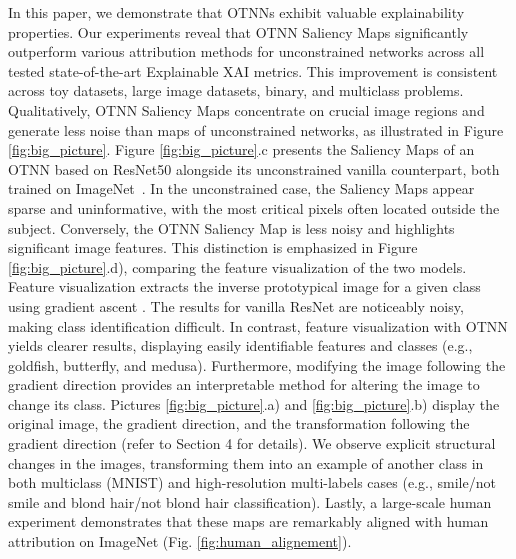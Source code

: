 In this paper, we demonstrate that OTNNs exhibit valuable explainability properties. Our experiments reveal that OTNN Saliency Maps significantly outperform various attribution methods for unconstrained networks across all tested state-of-the-art Explainable XAI metrics. This improvement is consistent across toy datasets, large image datasets, binary, and multiclass problems. Qualitatively, OTNN Saliency Maps concentrate on crucial image regions and generate less noise than maps of unconstrained networks, as illustrated in Figure \ref{fig:big_picture}. Figure \ref{fig:big_picture}.c presents the Saliency Maps of an OTNN based on ResNet50 alongside its unconstrained vanilla counterpart, both trained on ImageNet~\cite{imagenet_cvpr09}. In the unconstrained case, the Saliency Maps appear sparse and uninformative, with the most critical pixels often located outside the subject. Conversely, the OTNN Saliency Map is less noisy and highlights significant image features. This distinction is emphasized in Figure \ref{fig:big_picture}.d), comparing the feature visualization of the two models. Feature visualization extracts the inverse prototypical image for a given class using gradient ascent \cite{olah2017feature,nguyen2016multifaceted}. The results for vanilla ResNet are noticeably noisy, making class identification difficult. In contrast, feature visualization with OTNN yields clearer results, displaying easily identifiable features and classes (e.g., goldfish, butterfly, and medusa). Furthermore, modifying the image following the gradient direction provides an interpretable method for altering the image to change its class. Pictures \ref{fig:big_picture}.a) and \ref{fig:big_picture}.b) display the original image, the gradient direction, and the transformation following the gradient direction (refer to Section 4 for details). We observe explicit structural changes in the images, transforming them into an example of another class in both multiclass (MNIST) and high-resolution multi-labels cases (e.g., smile/not smile and blond hair/not blond hair classification). Lastly, a large-scale human experiment demonstrates that these maps are remarkably aligned with human attribution on ImageNet (Fig. \ref{fig:human_alignement}).


